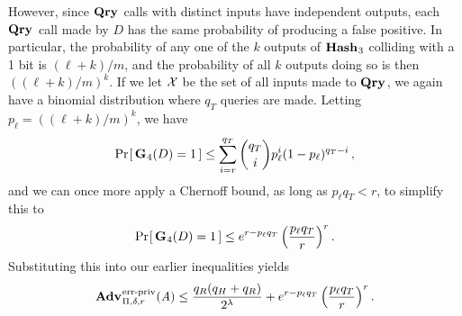 However, since $\textup{\textbf{Qry}}\hspace{0.5pt}$ calls with distinct inputs have independent outputs, each $\textup{\textbf{Qry}}\hspace{0.5pt}$ call made by $D$ has the same probability of producing a false positive. In particular, the probability of any one of the $k$ outputs of $\textup{\textbf{Hash}}\hspace{0.5pt}_3$ colliding with a 1 bit is $(\ell+k)/m$, and the probability of all $k$ outputs doing so is then $((\ell+k)/m)^k$. If we let $\mathcal{X}$ be the set of all inputs made to $\textup{\textbf{Qry}}\hspace{0.5pt}$, we again have a binomial distribution where $q_T$ queries are made. Letting $p_\ell = ((\ell+k)/m)^k$, we have
\begin{equation}
   \Pr\hspace{-1pt}\left[\,\textup{\textbf{G}}\hspace{0.5pt}_4(D)=1\,\right] \le
     \sum_{i=r}^{q_T} \binom{q_T}{i}p_\ell^i(1-p_\ell)^{q_T-i} \,,
\end{equation}
and we can once more apply a Chernoff bound, as long as $p_\ell q_T < r$, to simplify this to
\begin{equation}
   \Pr\hspace{-1pt}\left[\,\textup{\textbf{G}}\hspace{0.5pt}_4(D)=1\,\right] \le
     e^{r-p_\ell q_T}\left(\frac{p_\ell q_T}{r}\right)^r.
\end{equation}
%
Substituting this into our earlier inequalities yields
\begin{equation}
   \Adv{\erreps}_{\Pi,\delta,r}(\advA) \leq
     \frac{q_R(q_H+q_R)}{2^\lambda} + e^{r-p_\ell q_T}\left(\frac{p_\ell q_T}{r}\right)^r.
\end{equation}
